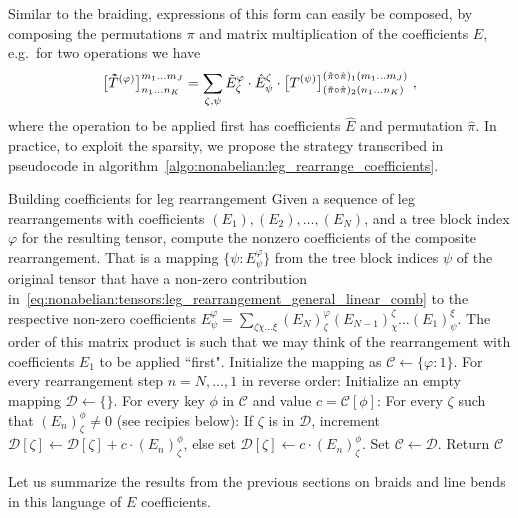 Similar to the braiding, expressions of this form can easily be composed, by composing the permutations $\pi$ and matrix multiplication of the coefficients $E$, e.g.~for two operations we have
\begin{equation}
    \big[ \doubletilde{T}^{(\varphi)} \big]^{m_1\dots m_J}_{n_1\dots n_K}
    = \sum_{\zeta,\psi} \tilde{E}_\zeta^\varphi \cdot \hat{E}_\psi^\zeta \cdot
    \big[ T^{(\psi)} \big]^{(\tilde{\pi} \compose \hat{\pi})_1(m_1\dots m_J)}_{(\tilde{\pi} \compose \hat{\pi})_2(n_1\dots n_K)}
    ~,
\end{equation}
where the operation to be applied first has coefficients $\hat{E}$ and permutation $\hat\pi$.
%
In practice, to exploit the sparsity, we propose the strategy transcribed in pseudocode in algorithm~\ref{algo:nonabelian:leg_rearrange_coefficients}.


\begin{Algorithm}{Building coefficients for leg rearrangement}{
    \label{algo:nonabelian:leg_rearrange_coefficients}
    Given a sequence of leg rearrangements with coefficients $(E_1), (E_2), \dots, (E_N)$, and a tree block index $\varphi$ for the resulting tensor, compute the nonzero coefficients of the composite rearrangement.
    That is a mapping $\{ \psi : E^\varphi_\psi \}$ from the tree block indices $\psi$ of the original tensor that have a non-zero contribution in~\eqref{eq:nonabelian:tensors:leg_rearrangement_general_linear_comb} to the respective non-zero coefficients $E^\varphi_\psi = \sum_{\zeta\chi\dots\xi} (E_N)^\varphi_{\zeta} (E_{N-1})^{\zeta}_\chi \dots (E_1)^\xi_\psi$. The order of this matrix product is such that we may think of the rearrangement with coefficients $E_1$ to be applied ``first".
}
    \step Initialize the mapping as $\mathcal{C} \gets \{ \varphi : 1\}$.
    \step For every rearrangement step $n = N, \dots, 1$ in reverse order:
    \step\quad Initialize an empty mapping $\mathcal{D} \gets \{\}$.
    \step\quad For every key $\phi$ in $\mathcal{C}$ and value $c = \mathcal{C}[\phi]$:
    \step\quad\quad For every $\zeta$ such that $(E_n)^\phi_\zeta \neq 0$ (see recipies below):
    \step\quad\quad\quad If $\zeta$ is in $\mathcal{D}$, increment $\mathcal{D}[\zeta] \gets \mathcal{D}[\zeta] + c \cdot (E_n)^\phi_\zeta$, else set $\mathcal{D}[\zeta] \gets c \cdot (E_n)^\phi_\zeta$.
    \step\quad Set $\mathcal{C}\gets\mathcal{D}$.
    \step Return $\mathcal{C}$
\end{Algorithm}

Let us summarize the results from the previous sections on braids and line bends in this language of $E$ coefficients.

